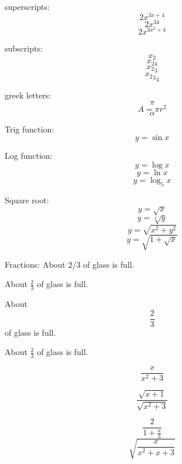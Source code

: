\documentclass[11pt]{article}
\begin{document}
superscripts: $$2x^{3x+4}$$
$$2x^{34}$$
$$2x^{3x^2+4}$$

subscripts:
$$x_2$$
$$x_{24}$$
$${x_2}_3$$
$${{x_2}_3}_4$$

greek letters:
$$\pi$$
$$A=\pi r^2$$
$$\alpha$$

Trig function:
$$y=\sin{x}$$

Log function:
$$y=\log{x}$$
$$y=\ln{x}$$
$$y=\log_5{x}$$

Square root:
$$y=\sqrt{x}$$
$$y=\sqrt[x]{y}$$
$$y=\sqrt{x^2+y^2}$$
$$y=\sqrt{1+\sqrt{x}}$$

Fractions:
About $2/3$ of glass is full.
 
About $\frac{2}{3}$ of glass is full.

About $$\frac{2}{3}$$ of glass is full.

About $\displaystyle{\frac{2}{3}}$ of glass is full.

$$\frac{x}{x^2+3}$$

$$\frac{\sqrt{x+1}}{\sqrt{x^2+3}}$$

$$\frac{2}{1+\frac{x}{3}}$$
$$\sqrt{\frac{x}{x^2+x+3}}$$
\end{document}
